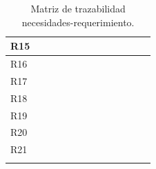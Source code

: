 \begin{center}
\begin{longtable}[!htb]{| m{2em} || m{2em} | m{2em}| m{2em}| m{2em}| m{2em}| m{2em}| m{2em}| m{2em}| m{2em}| m{2em}| m{2em}| m{2em}|}
    \hline
    R15 & \cellcolor{gr}{}&\cellcolor{gr}{} &\cellcolor{gr}{} & \cellcolor{gr}{}&\cellcolor{gr}{} & & & & & & & \\
    \hline
    R16 & & & & & & & & & &\cellcolor{gr}{} & & \\
    \hline
    R17 & & & & & & & & & &\cellcolor{gr}{} & & \\
    \hline
    R18 & & & & & &\cellcolor{gr}{} & & & & &\cellcolor{gr}{} &\cellcolor{gr}{} \\
    \hline
    R19 & & & & & & &\cellcolor{gr}{} &\cellcolor{gr}{} & & \cellcolor{gr}{}& & \\
    \hline
    R20 & & & & & & &\cellcolor{gr}{} & \cellcolor{gr}{}& & \cellcolor{gr}{}& & \\
    \hline
    R21 & & & & & &\cellcolor{gr}{} & & & & & \cellcolor{gr}{}& \cellcolor{gr}{}\\
    \hline

    \caption{Matriz de trazabilidad necesidades-requerimiento.}
    \label{tab:MatTraza}
    \end{longtable}
\end{center}

